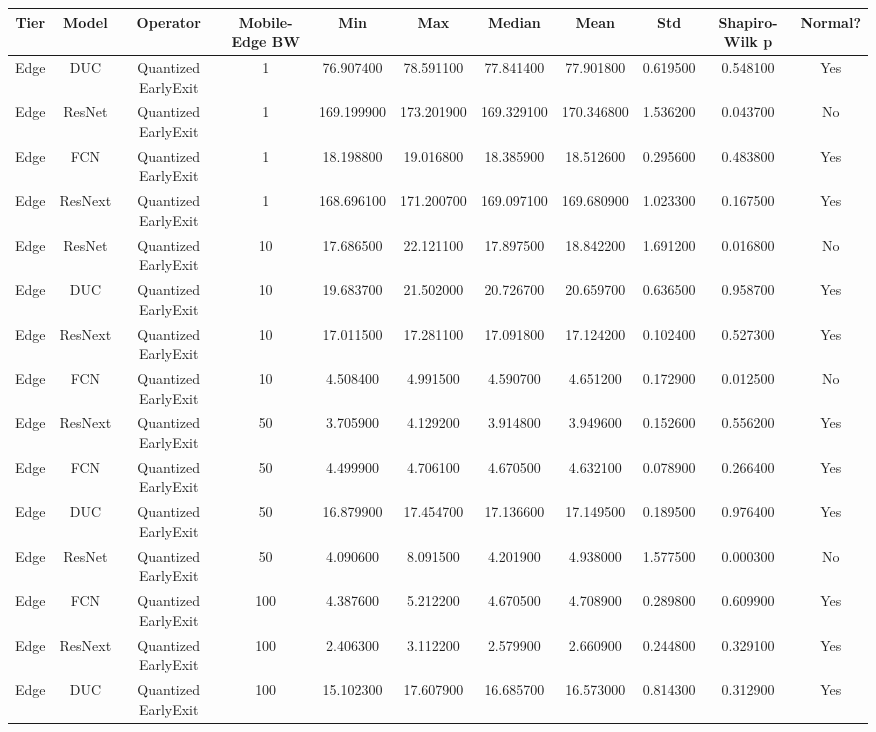 \begin{tabular}{|c||c||c||c||c||c||c||c||c||c||c|}
\toprule
Tier & Model & Operator & Mobile-Edge BW & Min & Max & Median & Mean & Std & Shapiro-Wilk p & Normal? \\
\midrule
Edge & DUC & Quantized EarlyExit & 1 & 76.907400 & 78.591100 & 77.841400 & 77.901800 & 0.619500 & 0.548100 & Yes \\
Edge & ResNet & Quantized EarlyExit & 1 & 169.199900 & 173.201900 & 169.329100 & 170.346800 & 1.536200 & 0.043700 & No \\
Edge & FCN & Quantized EarlyExit & 1 & 18.198800 & 19.016800 & 18.385900 & 18.512600 & 0.295600 & 0.483800 & Yes \\
Edge & ResNext & Quantized EarlyExit & 1 & 168.696100 & 171.200700 & 169.097100 & 169.680900 & 1.023300 & 0.167500 & Yes \\
Edge & ResNet & Quantized EarlyExit & 10 & 17.686500 & 22.121100 & 17.897500 & 18.842200 & 1.691200 & 0.016800 & No \\
Edge & DUC & Quantized EarlyExit & 10 & 19.683700 & 21.502000 & 20.726700 & 20.659700 & 0.636500 & 0.958700 & Yes \\
Edge & ResNext & Quantized EarlyExit & 10 & 17.011500 & 17.281100 & 17.091800 & 17.124200 & 0.102400 & 0.527300 & Yes \\
Edge & FCN & Quantized EarlyExit & 10 & 4.508400 & 4.991500 & 4.590700 & 4.651200 & 0.172900 & 0.012500 & No \\
Edge & ResNext & Quantized EarlyExit & 50 & 3.705900 & 4.129200 & 3.914800 & 3.949600 & 0.152600 & 0.556200 & Yes \\
Edge & FCN & Quantized EarlyExit & 50 & 4.499900 & 4.706100 & 4.670500 & 4.632100 & 0.078900 & 0.266400 & Yes \\
Edge & DUC & Quantized EarlyExit & 50 & 16.879900 & 17.454700 & 17.136600 & 17.149500 & 0.189500 & 0.976400 & Yes \\
Edge & ResNet & Quantized EarlyExit & 50 & 4.090600 & 8.091500 & 4.201900 & 4.938000 & 1.577500 & 0.000300 & No \\
Edge & FCN & Quantized EarlyExit & 100 & 4.387600 & 5.212200 & 4.670500 & 4.708900 & 0.289800 & 0.609900 & Yes \\
Edge & ResNext & Quantized EarlyExit & 100 & 2.406300 & 3.112200 & 2.579900 & 2.660900 & 0.244800 & 0.329100 & Yes \\
Edge & DUC & Quantized EarlyExit & 100 & 15.102300 & 17.607900 & 16.685700 & 16.573000 & 0.814300 & 0.312900 & Yes \\

\end{tabular}
